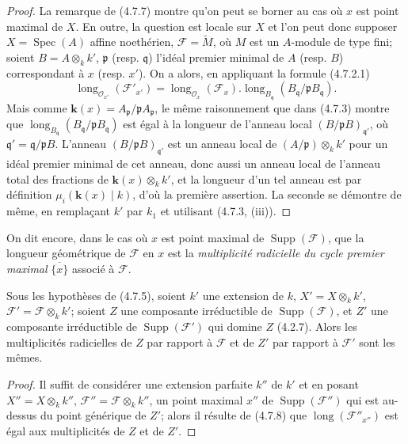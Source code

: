 \begin{proof}
La remarque de (4.7.7) montre qu'on peut se borner au cas où $x$ est point
maximal de $X$. En outre, la question est locale sur $X$ et l'on peut donc
supposer $X=\operatorname{Spec}(A)$ affine noethérien,
$\mathscr F=\widetilde M$, où $M$ est un $A$-module de type fini; soient
$B=A\otimes_k k'$, $\mathfrak p$ (resp. $\mathfrak q$) l'idéal premier
minimal de $A$ (resp. $B$) correspondant à $x$ (resp. $x'$). On a alors, en
appliquant la formule (4.7.2.1)
\[
\operatorname{long}_{\mathcal O_{x'}}(\mathscr F'_{x'})
=\operatorname{long}_{\mathcal O_x}(\mathscr F_x)
 .\operatorname{long}_{B_{\mathfrak q}}
 (B_{\mathfrak q}/\mathfrak pB_{\mathfrak q}).
\]
Mais comme $\boldsymbol{k}(x)=A_{\mathfrak p}/\mathfrak pA_{\mathfrak p}$, le même
raisonnement que dans (4.7.3) montre que
$\operatorname{long}_{B_{\mathfrak q}}
(B_{\mathfrak q}/\mathfrak pB_{\mathfrak q})$ est égal à la longueur de
l'anneau local $(B/\mathfrak pB)_{\mathfrak q'}$, où
$\mathfrak q'=\mathfrak q/\mathfrak pB$. L'anneau
$(B/\mathfrak pB)_{\mathfrak q'}$ est un anneau local de
$(A/\mathfrak p)\otimes_k k'$ pour un idéal premier minimal de cet anneau,
donc aussi un anneau local de l'anneau total des fractions de
$\boldsymbol{k}(x)\otimes_k k'$, et la longueur d'un tel anneau est par définition
$\mu_i(\boldsymbol{k}(x)\mid k)$, d'où la première assertion. La seconde se démontre de
même, en remplaçant $k'$ par $k_1$ et utilisant (4.7.3, (iii)).
\end{proof}

On dit encore, dans le cas où $x$ est point maximal de
$\operatorname{Supp}(\mathscr F)$, que la longueur géométrique de $\mathscr F$
en $x$ est la \emph{multiplicité radicielle du cycle premier maximal}
$\overline{\{x\}}$ associé à $\mathscr F$.

\begin{corollary}[4.7.9]
\label{IV.2.4.7.9-fr}
Sous les hypothèses de \textup{(4.7.5)}, soient $k'$ une extension de $k$,
$X'=X\otimes_k k'$, $\mathscr F'=\mathscr F\otimes_k k'$; soient $Z$ une
composante irréductible de $\operatorname{Supp}(\mathscr F)$, et $Z'$ une
composante irréductible de $\operatorname{Supp}(\mathscr F')$ qui domine $Z$
\textup{(4.2.7)}. Alors les multiplicités radicielles de $Z$ par rapport à
$\mathscr F$ et de $Z'$ par rapport à $\mathscr F'$ sont les mêmes.
\end{corollary}


\begin{proof}
Il suffit de considérer une extension parfaite $k''$ de $k'$ et en posant
$X''=X\otimes_k k''$, $\mathscr F''=\mathscr F\otimes_k k''$, un point
maximal $x''$ de $\operatorname{Supp}(\mathscr F'')$ qui est au-dessus du
point générique de $Z'$; alors il résulte de (4.7.8) que
$\operatorname{long}(\mathscr F''_{x''})$ est égal aux multiplicités de $Z$ et
de $Z'$.
\end{proof}

